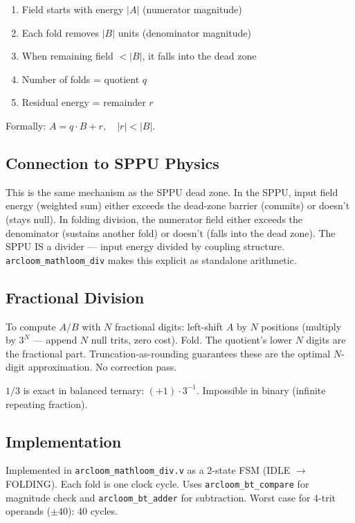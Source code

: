 \documentclass[11pt, a4paper]{report}
\begin{document}
\begin{enumerate}[nosep]
  \item Field starts with energy $|A|$ (numerator magnitude)
  \item Each fold removes $|B|$ units (denominator magnitude)
  \item When remaining field $< |B|$, it falls into the dead zone
  \item Number of folds = quotient $q$
  \item Residual energy = remainder $r$
\end{enumerate}

Formally: $A = q \cdot B + r, \quad |r| < |B|$.

\subsection{Connection to SPPU Physics}

This is the same mechanism as the SPPU dead zone. In the SPPU, input
field energy (weighted sum) either exceeds the dead-zone barrier (commits)
or doesn't (stays null). In folding division, the numerator field either
exceeds the denominator (sustains another fold) or doesn't (falls into
the dead zone). The SPPU IS a divider --- input energy divided by coupling
structure. \texttt{arcloom\_mathloom\_div} makes this explicit as
standalone arithmetic.

\subsection{Fractional Division}

To compute $A/B$ with $N$ fractional digits: left-shift $A$ by $N$
positions (multiply by $3^N$ --- append $N$ null trits, zero cost). Fold.
The quotient's lower $N$ digits are the fractional part.
Truncation-as-rounding guarantees these are the optimal $N$-digit
approximation. No correction pass.

$1/3$ is exact in balanced ternary: $(+1) \cdot 3^{-1}$. Impossible in
binary (infinite repeating fraction).

\subsection{Implementation}

Implemented in \texttt{arcloom\_mathloom\_div.v} as a 2-state FSM
(IDLE $\rightarrow$ FOLDING). Each fold is one clock cycle. Uses
\texttt{arcloom\_bt\_compare} for magnitude check and
\texttt{arcloom\_bt\_adder} for subtraction. Worst case for 4-trit
operands ($\pm 40$): 40 cycles.
\end{document}
